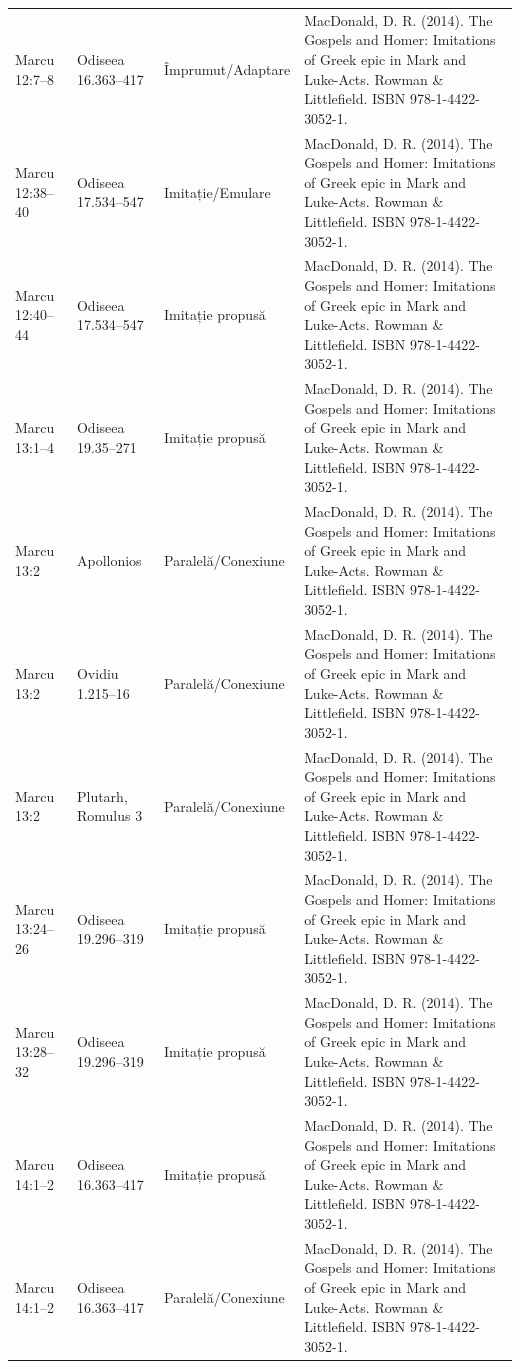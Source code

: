 \documentclass[12pt,a4paper,twoside,openany]{book}
\begin{document}
\begin{longtable}{L{1.4cm}L{1.7cm}L{3.1cm}L{8.4cm}}
Marcu 12:7–8 & Odiseea 16.363–417 & Împrumut/Adaptare & MacDonald, D. R. (2014). The Gospels and Homer: Imitations of Greek epic in Mark and Luke-Acts. Rowman \& Littlefield. ISBN 978-1-4422-3052-1. \\
Marcu 12:38–40 & Odiseea 17.534–547 & Imitație/Emulare & MacDonald, D. R. (2014). The Gospels and Homer: Imitations of Greek epic in Mark and Luke-Acts. Rowman \& Littlefield. ISBN 978-1-4422-3052-1. \\
Marcu 12:40–44 & Odiseea 17.534–547 & Imitație propusă & MacDonald, D. R. (2014). The Gospels and Homer: Imitations of Greek epic in Mark and Luke-Acts. Rowman \& Littlefield. ISBN 978-1-4422-3052-1. \\
Marcu 13:1–4 & Odiseea 19.35–271 & Imitație propusă & MacDonald, D. R. (2014). The Gospels and Homer: Imitations of Greek epic in Mark and Luke-Acts. Rowman \& Littlefield. ISBN 978-1-4422-3052-1. \\
Marcu 13:2 & Apollonios & Paralelă/Conexiune & MacDonald, D. R. (2014). The Gospels and Homer: Imitations of Greek epic in Mark and Luke-Acts. Rowman \& Littlefield. ISBN 978-1-4422-3052-1. \\
Marcu 13:2 & Ovidiu 1.215–16 & Paralelă/Conexiune & MacDonald, D. R. (2014). The Gospels and Homer: Imitations of Greek epic in Mark and Luke-Acts. Rowman \& Littlefield. ISBN 978-1-4422-3052-1. \\
Marcu 13:2 & Plutarh, Romulus 3 & Paralelă/Conexiune & MacDonald, D. R. (2014). The Gospels and Homer: Imitations of Greek epic in Mark and Luke-Acts. Rowman \& Littlefield. ISBN 978-1-4422-3052-1. \\
Marcu 13:24–26 & Odiseea 19.296–319 & Imitație propusă & MacDonald, D. R. (2014). The Gospels and Homer: Imitations of Greek epic in Mark and Luke-Acts. Rowman \& Littlefield. ISBN 978-1-4422-3052-1. \\
Marcu 13:28–32 & Odiseea 19.296–319 & Imitație propusă & MacDonald, D. R. (2014). The Gospels and Homer: Imitations of Greek epic in Mark and Luke-Acts. Rowman \& Littlefield. ISBN 978-1-4422-3052-1. \\
Marcu 14:1–2 & Odiseea 16.363–417 & Imitație propusă & MacDonald, D. R. (2014). The Gospels and Homer: Imitations of Greek epic in Mark and Luke-Acts. Rowman \& Littlefield. ISBN 978-1-4422-3052-1. \\
Marcu 14:1–2 & Odiseea 16.363–417 & Paralelă/Conexiune & MacDonald, D. R. (2014). The Gospels and Homer: Imitations of Greek epic in Mark and Luke-Acts. Rowman \& Littlefield. ISBN 978-1-4422-3052-1. \\

\end{longtable}
\end{document}
